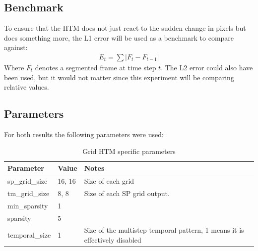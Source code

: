 \subsection{Benchmark}
To ensure that the HTM does not just react to the sudden change in pixels but does something more, the L1 error will be used as a benchmark to compare against:
\begin{align*}
    E_t=\sum|F_t-F_{t-1}|
\end{align*}
Where $F_t$ denotes a segmented frame at time step $t$. The L2 error could also have been used, but it would not matter since this experiment will be comparing relative values.
\subsection{Parameters}
For both results the following parameters were used:
\begin{table}[H]
    \centering
    \begin{tabularx}{\linewidth}{@{}XlX@{}}
        \toprule
        \textbf{Parameter} & \textbf{Value} & \textbf{Notes}                                                             \\
        \midrule
        sp\_grid\_size     & 16, 16         & Size of each grid                                                          \\
        tm\_grid\_size     & 8, 8           & Size of each SP grid output.                                               \\
        min\_sparsity      & 1              &                                                                            \\
        sparsity           & 5              &                                                                            \\
        temporal\_size     & 1              & Size of the multistep temporal pattern, 1 means it is effectively disabled \\
        \bottomrule
    \end{tabularx}
    \caption{Grid HTM specific parameters}
    \label{tab:sperm_params}
\end{table}
